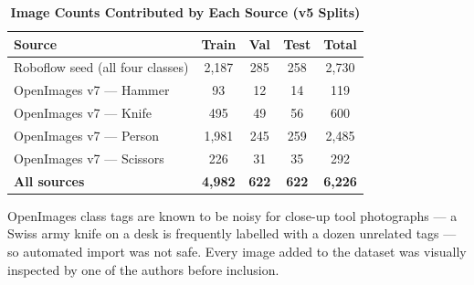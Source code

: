 \documentclass{ieeeaccess}
\begin{document}
\begin{table}[ht!]
\caption{\textbf{Image Counts Contributed by Each Source (v5 Splits)}}
\label{tab:sources}
\setlength{\tabcolsep}{3pt}
\centering\small
\begin{tabular}{|l|c|c|c|c|}
\hline
\textbf{Source} & \textbf{Train} & \textbf{Val} & \textbf{Test} & \textbf{Total} \\
\hline
Roboflow seed (all four classes)     & 2{,}187 & 285 & 258 & 2{,}730 \\
OpenImages v7 --- Hammer             & 93      & 12  & 14  & 119   \\
OpenImages v7 --- Knife              & 495     & 49  & 56  & 600   \\
OpenImages v7 --- Person             & 1{,}981 & 245 & 259 & 2{,}485 \\
OpenImages v7 --- Scissors           & 226     & 31  & 35  & 292   \\
\hline
\textbf{All sources}                 & \textbf{4{,}982} & \textbf{622} & \textbf{622} & \textbf{6{,}226} \\
\hline
\end{tabular}
\end{table}

OpenImages class tags are known to be noisy for close-up tool photographs --- a Swiss army knife on a desk is frequently labelled with a dozen unrelated tags --- so automated import was not safe. Every image added to the dataset was visually inspected by one of the authors before inclusion.
\end{document}
